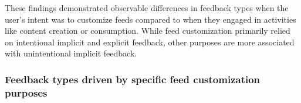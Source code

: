 
These findings demonstrated observable differences in feedback types when the user's intent was to customize feeds compared to when they engaged in activities like content creation or consumption. While feed customization primarily relied on intentional implicit and explicit feedback, other purposes are more associated with unintentional implicit feedback. 

\subsubsection{Feedback types driven by specific feed customization purposes}

\begin{table*}[]
\centering
\small
\caption{The frequencies of intentional implicit feedback and explicit feedback across four specific feed customization purposes, including increasing content diversity, improving recommendation relevance, reducing inappropriate content, and protecting privacy.}
\label{tab:feedback_algopurpose}
\vspace*{-8pt}
\end{table*}

